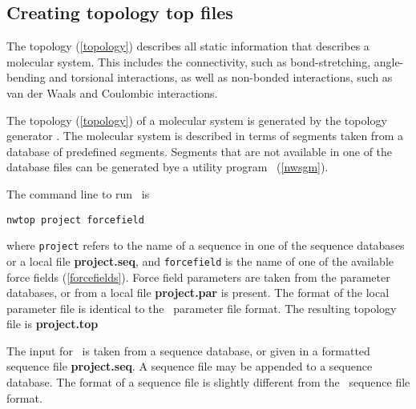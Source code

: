 \subsection{Creating topology {\bf top} files}
\label{nwtop}
\par
The topology (\ref{topology}) describes all static information
that describes a molecular system. This includes the connectivity, such
as bond-stretching, angle-bending and torsional interactions, as well as
non-bonded interactions, such as van der Waals and Coulombic interactions.
\par
The topology (\ref{topology}) of a molecular system is 
generated by the topology generator \nwtop. The molecular system
is described in terms of segments taken from a database of predefined
segments. Segments that are not available in one of the database files
can be generated bye a utility program \nwsgm\ (\ref{nwsgm}).
\par
The command line to run \nwtop\ is
\begin{verbatim}
nwtop project forcefield
\end{verbatim}
where {\tt project} refers to the name of a sequence in one of the
sequence databases or a local file {\bf project.seq}, and
{\tt forcefield} is the name of one of the 
available force fields (\ref{forcefields}).
Force field parameters are taken from the parameter databases,
or from a local file {\bf project.par} is present. The 
format of the local parameter file is identical to the 
\argos\ parameter file format.
The resulting topology file is {\bf project.top}
\par
The input for \nwtop\ is taken from a sequence database, or
given in a formatted sequence file {\bf project.seq}. A sequence
file may be appended to a sequence database. The 
format of a sequence file is slightly different from the \argos\ 
sequence file format.
